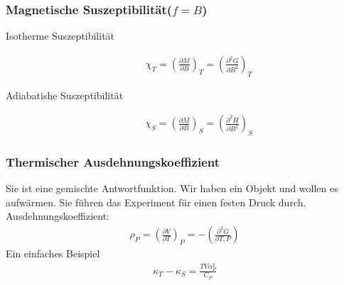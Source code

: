 \documentclass[11pt]{article}
\theoremstyle{plain}
\theoremstyle{mytheoremstyle}
\newcommand{\pd}[2]{\frac{\partial #1 }{\partial #2}}
\begin{document}
\subsubsection*{Magnetische Suszeptibilität($f = B$)  }
\begin{description}
  \item[Isotherme Suszeptibilität]  
    \begin{align*}
      \chi_T = \left( \pd{M}{B} \right)_T= \left( \pd{^2 G}{B^2} \right)_T
    \end{align*}
  \item[Adiabatishe Suszeptibilität]
    \begin{align*}
      \chi_S = \left( \pd{M}{B} \right)_S = \left( \pd{^2 H}{B^2} \right)_S
    \end{align*}
\end{description}
\subsubsection*{Thermischer Ausdehnungskoeffizient}
Sie ist eine gemischte Antwortfunktion.
Wir haben ein Objekt und wollen es aufwärmen. Sie führen das Experiment für einen
festen Druck durch. 
%
Ausdehnungskoeffizient:
\begin{align*}
  \rho_P = \left( \pd{V}{T} \right)_P = - \left( \pd{^2 G}{T, P} \right)
\end{align*}
%
Ein einfaches Beispiel
%
\begin{align*}
  \kappa_T - \kappa_S =\frac{ T V \alpha_P^2}{C_P}
\end{align*}
%



\end{document}
